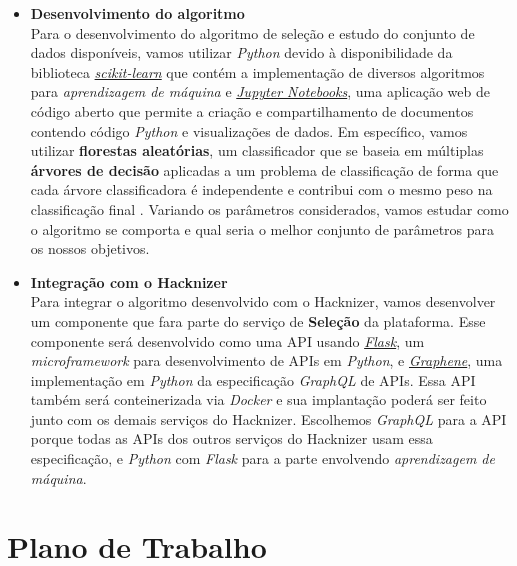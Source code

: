 \documentclass[10pt,twoside,a4paper]{article}
\begin{document}
      \begin{itemize}
          \item \textbf{Desenvolvimento do algoritmo} \\
          Para o desenvolvimento do algoritmo de seleção e estudo do conjunto de dados disponíveis, vamos utilizar \textit{Python} devido à disponibilidade da biblioteca \href{http://scikit-learn.org}{\textit{scikit-learn}} que contém a implementação de diversos algoritmos para \textit{aprendizagem de máquina} e \href{http://jupyter.org/}{\textit{Jupyter Notebooks}}, uma aplicação web de código aberto que permite a criação e compartilhamento de documentos contendo código \textit{Python} e visualizações de dados. Em específico, vamos utilizar \textbf{florestas aleatórias}, um classificador que se baseia em múltiplas \textbf{árvores de decisão} aplicadas a um problema de classificação de forma que cada árvore classificadora é independente e contribui com o mesmo peso na classificação final \cite{Breiman2001RandomForests}. Variando os parâmetros considerados, vamos estudar como o algoritmo se comporta e qual seria o melhor conjunto de parâmetros para os nossos objetivos.
          
          \item \textbf{Integração com o Hacknizer} \\
          Para integrar o algoritmo desenvolvido com o Hacknizer, vamos desenvolver um componente que fara parte do serviço de \textbf{Seleção} da plataforma. Esse componente será desenvolvido como uma API usando \href{http://flask.pocoo.org/}{\textit{Flask}}, um \textit{microframework} para desenvolvimento de APIs em \textit{Python}, e \href{https://graphene-python.org/}{\textit{Graphene}}, uma implementação em \textit{Python} da especificação \textit{GraphQL} de APIs. Essa API também será conteinerizada via \textit{Docker} e sua implantação poderá ser feito junto com os demais serviços do Hacknizer.
          Escolhemos \textit{GraphQL} para a API porque todas as APIs dos outros serviços do Hacknizer usam essa especificação, e \textit{Python} com \textit{Flask} para a parte envolvendo \textit{aprendizagem de máquina}.
      \end{itemize}
    
\section{Plano de Trabalho}
  
\end{document}
